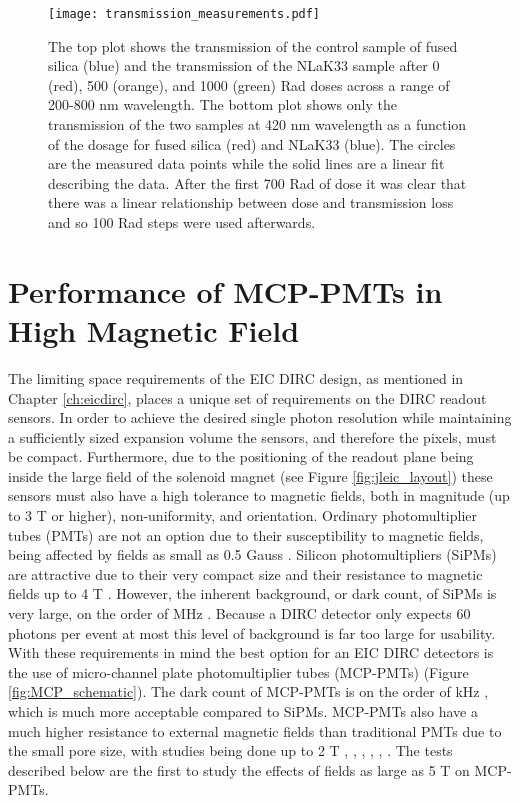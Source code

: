 \begin{figure}[!htb]
	\centering
	\texttt{[image: transmission\_measurements.pdf]}
	\caption{The top plot shows the transmission of the control sample of fused silica (blue) and the transmission of the NLaK33 sample after 0 (red), 500 (orange), and 1000 (green) Rad doses across a range of 200-800 nm wavelength. The bottom plot shows only the transmission of the two samples at 420 nm wavelength as a function of the dosage for fused silica (red) and NLaK33 (blue). The circles are the measured data points while the solid lines are a linear fit describing the data. After the first 700 Rad of dose it was clear that there was a linear relationship between dose and transmission loss and so 100 Rad steps were used afterwards.}
	\label{fig:transmission_measurements}
\end{figure}



\section{Performance of MCP-PMTs in High Magnetic Field}
The limiting space requirements of the EIC DIRC design, as mentioned in Chapter \ref{ch:eicdirc}, places a unique set of requirements on the DIRC readout sensors. In order to achieve the desired single photon resolution while maintaining a sufficiently sized expansion volume the sensors, and therefore the pixels, must be compact. Furthermore, due to the positioning of the readout plane being inside the large field of the solenoid magnet (see Figure \ref{fig:jleic_layout}) these sensors must also have a high tolerance to magnetic fields, both in magnitude (up to 3 T or higher), non-uniformity, and orientation. Ordinary photomultiplier tubes (PMTs) are not an option due to their susceptibility to magnetic fields, being affected by fields as small as 0.5 Gauss \cite{PMT_magnet}. Silicon photomultipliers (SiPMs) are attractive due to their very compact size and their resistance to magnetic fields up to 4 T \cite{SiPM_characterization}. However, the inherent background, or dark count, of SiPMs is very large, on the order of MHz \cite{SiPM_characterization}. Because a DIRC detector only expects 60 photons per event at most this level of background is far too large for usability. With these requirements in mind the best option for an EIC DIRC detectors is the use of micro-channel plate photomultiplier tubes (MCP-PMTs) (Figure \ref{fig:MCP_schematic}). The dark count of MCP-PMTs is on the order of kHz \cite{MCPPMT_darkcount}, which is much more acceptable compared to SiPMs. MCP-PMTs also have a much higher resistance to external magnetic fields than traditional PMTs due to the small pore size, with studies being done up to 2 T \cite{MCPTest1}, \cite{MCPTest2}, \cite{MCPTest3}, \cite{MCPTest4}, \cite{MCPTest5}, \cite{MCPTest6}. The tests described below are the first to study the effects of fields as large as 5 T on MCP-PMTs.

